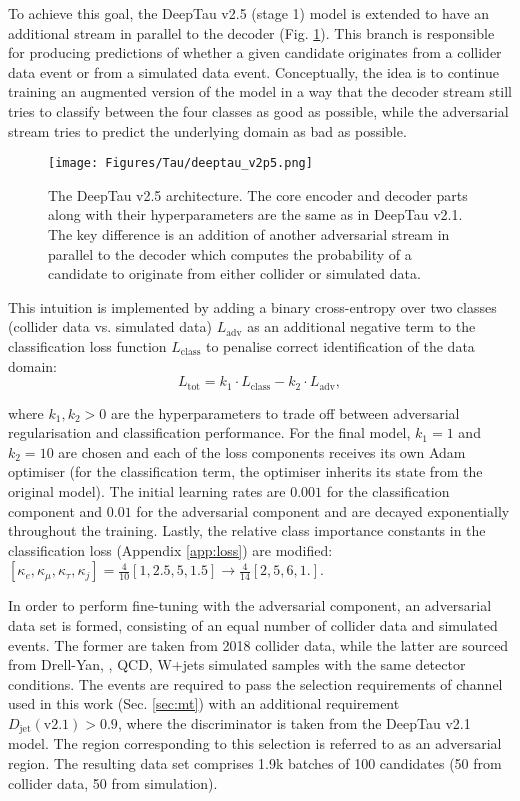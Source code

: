 To achieve this goal, the DeepTau v2.5 (stage 1) model is extended to have an additional stream in parallel to the decoder (Fig. \ref{fig:deeptau_v2p5_arch}). This branch is responsible for producing predictions of whether a given \tauh candidate originates from a collider data event or from a simulated data event. Conceptually, the idea is to continue training an augmented version of the model in a way that the decoder stream still tries to classify between the four classes as good as possible, while the adversarial stream tries to predict the underlying \tauh domain as bad as possible. 

\begin{figure}[!t]
    \centering
    \texttt{[image: Figures/Tau/deeptau\_v2p5.png]}
    \caption{The DeepTau v2.5 architecture. The core encoder and decoder parts along with their hyperparameters are the same as in DeepTau v2.1. The key difference is an addition of another adversarial stream in parallel to the decoder which computes the probability of a \tauh candidate to originate from either collider or simulated data.}
    \label{fig:deeptau_v2p5_arch}
\end{figure}

This intuition is implemented by adding a binary cross-entropy over two classes (collider data vs. simulated data) $L_\text{adv}$ as an additional negative term to the classification loss function $L_\text{class}$ to penalise correct identification of the data domain:
\begin{equation}
    L_\text{tot} = k_1 \cdot L_\text{class} - k_2 \cdot L_\text{adv},
\end{equation}\label{eq:adv_loss}

where $k_1, k_2 > 0$ are the hyperparameters to trade off between adversarial regularisation and classification performance. For the final model, $k_1=1$ and $k_2=10$ are chosen and each of the loss components receives its own Adam optimiser (for the classification term, the optimiser inherits its state from the original model). The initial learning rates are $0.001$ for the classification component and $0.01$ for the adversarial component and are decayed exponentially throughout the training. Lastly, the relative class importance constants in the classification loss (Appendix \ref{app:loss}) are modified: $[\kappa_e, \kappa_\mu, \kappa_\tau, \kappa_j] = \frac{4}{10}[1, 2.5, 5, 1.5] \to \frac{4}{14}[2, 5, 6, 1.]$.  

In order to perform fine-tuning with the adversarial component, an adversarial data set is formed, consisting of an equal number of collider data and simulated events. The former are taken from 2018 collider data, while the latter are sourced from Drell-Yan, \ttbar, QCD, W+jets simulated samples with the same detector conditions. The events are required to pass the selection requirements of \mt channel used in this work (Sec. \ref{sec:mt}) with an additional requirement $D_\text{jet}(\text{v2.1}) > 0.9$, where the discriminator is taken from the DeepTau v2.1 model. The region corresponding to this selection is referred to as an adversarial region. The resulting data set comprises 1.9k batches of 100 \tauh candidates (50 from collider data, 50 from simulation).


